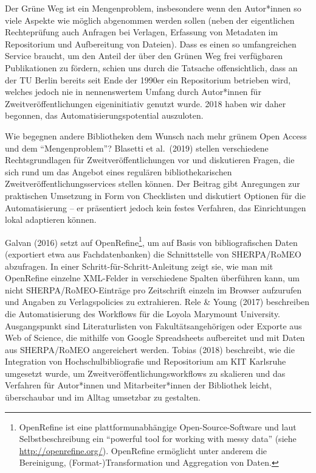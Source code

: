 \documentclass[a4paper,
fontsize=11pt,
oneside,
numbers=noperiodatend,
parskip=half-,
bibliography=totoc,
final
]{scrartcl}
\begin{document}
Der Grüne Weg ist ein Mengenproblem, insbesondere wenn den Autor*innen
so viele Aspekte wie möglich abgenommen werden sollen (neben der
eigentlichen Rechteprüfung auch Anfragen bei Verlagen, Erfassung von
Metadaten im Repositorium und Aufbereitung von Dateien). Dass es einen
so umfangreichen Service braucht, um den Anteil der über den Grünen Weg
frei verfügbaren Publikationen zu fördern, schien uns durch die Tatsache
offensichtlich, dass an der TU Berlin bereits seit Ende der 1990er ein
Repositorium betrieben wird, welches jedoch nie in nennenswertem Umfang
durch Autor*innen für Zweitveröffentlichungen eigeninitiativ genutzt
wurde. 2018 haben wir daher begonnen, das Automatisierungspotential
auszuloten.

Wie begegnen andere Bibliotheken dem Wunsch nach mehr grünem Open Access
und dem \enquote{Mengenproblem}? Blasetti et al.~(2019) stellen
verschiedene Rechtsgrundlagen für Zweitveröffentlichungen vor und
diskutieren Fragen, die sich rund um das Angebot eines regulären
bibliothekarischen Zweitveröffentlichungsservices stellen können. Der
Beitrag gibt Anregungen zur praktischen Umsetzung in Form von
Checklisten und diskutiert Optionen für die Automatisierung -- er
präsentiert jedoch kein festes Verfahren, das Einrichtungen lokal
adaptieren können.

Galvan (2016) setzt auf OpenRefine\footnote{OpenRefine ist eine
  plattformunabhängige Open-Source-Software und laut Selbstbeschreibung
  ein \enquote{powerful tool for working with messy data} (siehe
  \url{http://openrefine.org/}). OpenRefine ermöglicht unter anderem die
  Bereinigung, (Format-)Transformation und Aggregation von Daten.}, um
auf Basis von bibliografischen Daten (exportiert etwa aus
Fachdatenbanken) die Schnittstelle von SHERPA/RoMEO abzufragen. In einer
Schritt-für-Schritt-Anleitung zeigt sie, wie man mit OpenRefine einzelne
XML-Felder in verschiedene Spalten überführen kann, um nicht
SHERPA/RoMEO-Einträge pro Zeitschrift einzeln im Browser aufzurufen und
Angaben zu Verlagspolicies zu extrahieren. Rele \& Young (2017)
beschreiben die Automatisierung des Workflows für die Loyola Marymount
University. Ausgangspunkt sind Literaturlisten von Fakultätsangehörigen
oder Exporte aus Web of Science, die mithilfe von Google Spreadsheets
aufbereitet und mit Daten aus SHERPA/RoMEO angereichert werden. Tobias
(2018) beschreibt, wie die Integration von Hochschulbibliografie und
Repositorium am KIT Karlsruhe umgesetzt wurde, um
Zweitveröffentlichungsworkflows zu skalieren und das Verfahren für
Autor*innen und Mitarbeiter*innen der Bibliothek leicht, überschaubar
und im Alltag umsetzbar zu gestalten.
\end{document}
